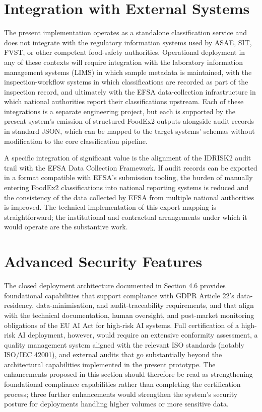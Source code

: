 \hypertarget{integration-with-external-systems}{%
\section{Integration with External Systems}\label{integration-with-external-systems}}

The present implementation operates as a standalone classification service and does not integrate with the regulatory information systems used by ASAE, SIT, FVST, or other competent food-safety authorities. Operational deployment in any of these contexts will require integration with the laboratory information management systems (LIMS) in which sample metadata is maintained, with the inspection-workflow systems in which classifications are recorded as part of the inspection record, and ultimately with the EFSA data-collection infrastructure in which national authorities report their classifications upstream. Each of these integrations is a separate engineering project, but each is supported by the present system's emission of structured FoodEx2 outputs alongside audit records in standard JSON, which can be mapped to the target systems' schemas without modification to the core classification pipeline.

A specific integration of significant value is the alignment of the IDRISK2 audit trail with the EFSA Data Collection Framework. If audit records can be exported in a format compatible with EFSA's submission tooling, the burden of manually entering FoodEx2 classifications into national reporting systems is reduced and the consistency of the data collected by EFSA from multiple national authorities is improved. The technical implementation of this export mapping is straightforward; the institutional and contractual arrangements under which it would operate are the substantive work.

\hypertarget{advanced-security-features}{%
\section{Advanced Security Features}\label{advanced-security-features}}

The closed deployment architecture documented in Section 4.6 provides foundational capabilities that support compliance with GDPR Article 22's data-residency, data-minimisation, and audit-traceability requirements, and that align with the technical documentation, human oversight, and post-market monitoring obligations of the EU AI Act for high-risk AI systems. Full certification of a high-risk AI deployment, however, would require an extensive conformity assessment, a quality management system aligned with the relevant ISO standards (notably ISO/IEC 42001), and external audits that go substantially beyond the architectural capabilities implemented in the present prototype. The enhancements proposed in this section should therefore be read as strengthening foundational compliance capabilities rather than completing the certification process; three further enhancements would strengthen the system's security posture for deployments handling higher volumes or more sensitive data.

